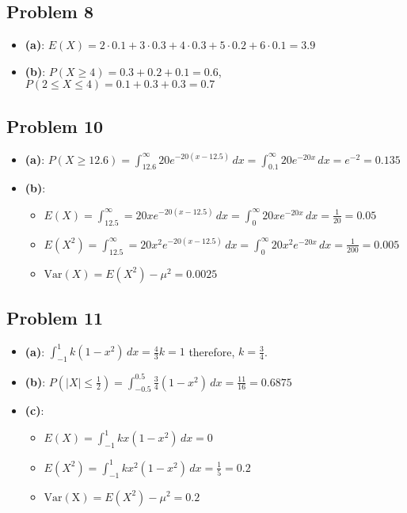 \documentclass{article}
\begin{document}
\subsection*{Problem 8}

\begin{itemize}
	\item \textbf{(a)}: $E(X) = 2 \cdot 0.1 + 3 \cdot 0.3 + 4 \cdot 0.3 + 5 \cdot 0.2 + 6 \cdot 0.1 = 3.9$
	\item \textbf{(b)}: $P(X \ge 4) = 0.3 + 0.2 + 0.1 = 0.6$, $P(2 \le X \le 4) = 0.1 + 0.3 + 0.3 = 0.7$
\end{itemize}

\subsection*{Problem 10}

\begin{itemize}
	\item \textbf{(a)}: $P(X \ge 12.6) = \int_{12.6}^{\infty} 20e^{-20(x-12.5)}\,dx =
		\int_{0.1}^{\infty} 20e^{-20x}\,dx = e^{-2} = 0.135$
	\item \textbf{(b)}:
		\begin{itemize}
			\item $E(X) = \int_{12.5}^{\infty} = 20xe^{-20(x-12.5)}\,dx =
				\int_{0}^{\infty} 20xe^{-20x}\,dx = \frac{1}{20} = 0.05$
			\item $E(X^2) =\int_{12.5}^{\infty} = 20x^{2}e^{-20(x-12.5)}\,dx =
				\int_{0}^{\infty} 20x^{2}e^{-20x}\,dx = \frac{1}{200} = 0.005$
			\item $\mathrm{Var}(X) = E(X^2) - \mu^2 = 0.0025$
		\end{itemize}
\end{itemize}

\subsection*{Problem 11}

\begin{itemize}
	\item \textbf{(a)}: $\int_{-1}^{1} k(1-x^2)\,dx = \frac{4}{3}k = 1$ therefore, $k = \frac{3}{4}$.
	\item \textbf{(b)}: $P(|X| \le \frac{1}{2}) =
		\int_{-0.5}^{0.5} \frac{3}{4} (1-x^2)\,dx = \frac{11}{16} = 0.6875$
	\item \textbf{(c)}:
		\begin{itemize}
			\item $E(X) = \int_{-1}^{1} kx(1-x^2)\,dx = 0$
			\item $E(X^2) = \int_{-1}^{1} kx^2(1-x^2)\,dx = \frac{1}{5} = 0.2$
			\item $\mathrm{Var(X)} = E(X^2) - \mu^2 = 0.2$
		\end{itemize}
\end{itemize}
\end{document}
